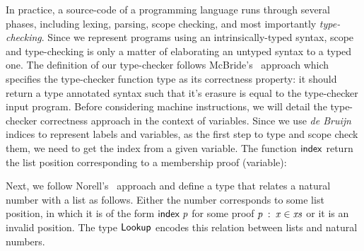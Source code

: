 \documentclass[review]{elsarticle}
\theoremstyle{definition}
\def\resethooks{%
  \global\let\SaveRestoreHook\empty
  \global\let\ColumnHook\empty}
\newcommand{\hsindent}[1]{\quad}%
\let\hspre\empty
\let\hspost\empty
\newcommand{\D}[1]{\blue{\mathsf{#1}}}
\newcommand{\Con}[1]{\red{\mathsf{#1}}}
\newcommand{\F}[1]{\green{\mathsf{#1}}}
\newcommand{\V}[1]{\purple{\mathit{#1}}}
\begin{document}
In practice, a source-code of a programming language runs through several phases,
including lexing, parsing, scope checking, and most importantly \emph{type-checking}.
Since we represent programs using an intrinsically-typed syntax, scope and
type-checking is only a matter of elaborating an untyped syntax to a typed one.
The definition of our type-checker follows McBride's~\cite{McBride2004} approach which
specifies the type-checker function type as its correctness property: it should return
a type annotated syntax such that it's erasure is equal to the type-checker input program.
Before considering machine instructions, we will detail the type-checker correctness
approach in the context of variables.
Since we use \emph{de Bruijn} indices to represent labels and variables, as the first
step to type and scope check them, we need to get the index from a given variable.
The function \ensuremath{\F{index}} return the list position corresponding to a membership proof (variable):
\resethooks
Next, we follow Norell's~\cite{Norell2009} approach and define a type that relates a
natural number with a list as follows. Either the number corresponds to some list position,
in which it is of the form \ensuremath{\F{index}\;\V{p}} for some proof \ensuremath{\V{p}\;\mathbin{:}\;\V{x}\;\D{\in}\;\V{xs}} or it is an invalid position.
The type \ensuremath{\D{Lookup}} encodes this relation between lists and natural numbers.
\resethooks
\end{document}

